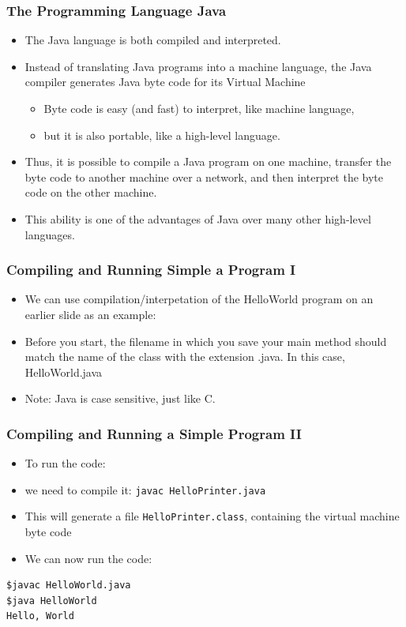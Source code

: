 \documentclass{beamer}
\begin{document}
\begin{frame}
\frametitle{The Programming Language Java}
\begin{itemize}
\item The Java language is both compiled and
interpreted.  
\item Instead of translating Java programs into a 
machine language, the Java compiler generates Java byte code for its \alert{Virtual Machine}
\begin{itemize}
\item Byte code is easy (and fast) to interpret, like machine language,
\item but it is also portable, like a high-level language.  
\end{itemize}
\item Thus, it is possible to compile a Java program on one machine,
transfer the byte code to another machine over a network,
and then interpret the byte code on the other machine.  
\item This ability is one of the advantages of Java over many other
high-level languages.
\end{itemize}
\end{frame}

\begin{frame}[fragile]
\frametitle{Compiling and Running Simple a Program I}
\begin{itemize}
\item We can use compilation/interpetation of the HelloWorld program on an earlier slide as an example:
\item Before you start, the filename in which you save your main method should match the name of the class with the extension .java. In this case, HelloWorld.java
\item Note: Java is \alert{case sensitive}, just like C.
\end{itemize}
\end{frame}

\begin{frame}[fragile]
\frametitle{Compiling and Running a Simple Program II}
\begin{itemize}
\item To run the code:
\item we need to compile it: \lstinline!javac HelloPrinter.java!
\item This will generate a file \lstinline!HelloPrinter.class!, containing the virtual machine byte code
\item We can now run the code:
\end{itemize}
\begin{block}{}
\begin{lstlisting}
$javac HelloWorld.java
$java HelloWorld
Hello, World
\end{lstlisting}
\end{block}

\end{frame}
\end{document}
